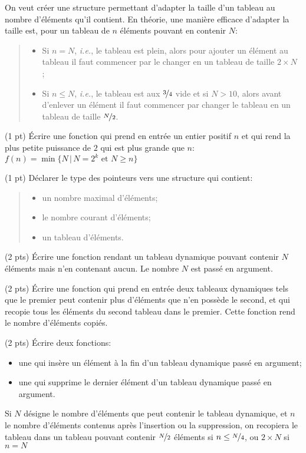 
On veut cr{\'e}er une structure permettant d'adapter la taille d'un
tableau au nombre d'{\'e}l{\'e}ments qu'il contient. En th{\'e}orie, une mani{\`e}re
efficace d'adapter la taille est, pour un tableau de $n$ {\'e}l{\'e}ments
pouvant en contenir $N$:
\begin{quote}
  \begin{itemize}\itemsep=-3pt
  \item Si $n = N$, \textit{i.e.}, le tableau est plein, alors pour ajouter
    un élément au tableau il faut commencer par le changer en un tableau de
    taille $2\times N$ ;
  \item Si $n\le N$, \textit{i.e.}, le tableau est aux $\nicefrac 34$
    vide et si $N>10$, alors avant d'enlever un élément il faut commencer
    par changer le tableau en un tableau de taille
    $\nicefrac N 2$.
  \end{itemize}
\end{quote}


\question (1 pt) {\'E}crire une fonction qui prend en entr{\'e}e un entier
positif $n$ et qui rend la plus petite puissance de $2$ qui est plus
grande que $n$: $f(n) = \min \lbrace N \,\vert\, N=2^k \text{ et } N\ge n\rbrace$

\question (1 pt) D{\'e}clarer le type  des pointeurs vers une
structure  qui contient:
\begin{quote}
  \begin{itemize}\setlength\itemsep {-3pt}
  \item un nombre maximal d'{\'e}l{\'e}ments;
  \item le nombre courant d'{\'e}l{\'e}ments;
  \item un tableau  d'{\'e}l{\'e}ments.
  \end{itemize}
\end{quote}

\question (2 pts) {\'E}crire une fonction rendant un tableau dynamique
pouvant contenir $N$ {\'e}l{\'e}ments mais n'en contenant aucun. Le nombre $N$
est pass{\'e} en argument.

\question (2 pts) {\'E}crire une fonction qui prend en entr{\'e}e deux
tableaux dynamiques tels que le premier peut contenir plus d'{\'e}l{\'e}ments
que n'en poss{\`e}de le second, et qui recopie tous les {\'e}l{\'e}ments du second
tableau dans le premier. Cette fonction rend le nombre d'{\'e}l{\'e}ments
copi{\'e}s.


\question (2 pts) {\'E}crire deux fonctions:
\begin{itemize}
\item une qui ins{\`e}re un {\'e}l{\'e}ment {\`a} la fin d'un tableau dynamique pass{\'e}
  en argument;
\item une qui supprime le dernier {\'e}l{\'e}ment d'un tableau dynamique pass{\'e}
  en argument.
\end{itemize}
Si $N$ d{\'e}signe le nombre d'{\'e}l{\'e}ments que peut contenir le tableau
dynamique, et $n$ le nombre d'{\'e}l{\'e}ments contenus apr{\`e}s l'insertion ou
la suppression, on recopiera le tableau dans un tableau pouvant
contenir $\nicefrac N2$ {\'e}l{\'e}ments si $n\le \nicefrac N4$, ou $2\times
N$ si $n=N$


